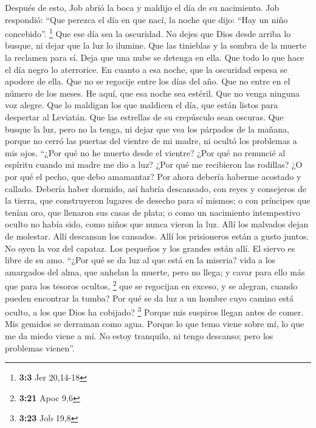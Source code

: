  Después de esto, Job abrió la boca y maldijo el día de su
nacimiento.  Job respondió:  ``Que perezca
el día en que nací, la noche que dijo: ``Hay un niño concebido''.
\footnote{\textbf{3:3} Jer 20,14-18}  Que ese día sea la
oscuridad. No dejes que Dios desde arriba lo busque, ni dejar que la luz
lo ilumine.  Que las tinieblas y la sombra de la muerte la
reclamen para sí. Deja que una nube se detenga en ella. Que todo lo que
hace el día negro lo aterrorice.  En cuanto a esa noche,
que la oscuridad espesa se apodere de ella. Que no se regocije entre los
días del año. Que no entre en el número de los meses.  He
aquí, que esa noche sea estéril. Que no venga ninguna voz alegre.
 Que lo maldigan los que maldicen el día, que están listos
para despertar al Leviatán.  Que las estrellas de su
crepúsculo sean oscuras. Que busque la luz, pero no la tenga, ni dejar
que vea los párpados de la mañana,  porque no cerró las
puertas del vientre de mi madre, ni ocultó los problemas a mis ojos.
 ``¿Por qué no he muerto desde el vientre? ¿Por qué no
renuncié al espíritu cuando mi madre me dio a luz?  ¿Por
qué me recibieron las rodillas? ¿O por qué el pecho, que debo amamantar?
 Por ahora debería haberme acostado y callado. Debería
haber dormido, así habría descansado,  con reyes y
consejeros de la tierra, que construyeron lugares de desecho para sí
mismos;  o con príncipes que tenían oro, que llenaron sus
casas de plata;  o como un nacimiento intempestivo oculto
no había sido, como niños que nunca vieron la luz.  Allí
los malvados dejan de molestar. Allí descansan los cansados.
 Allí los prisioneros están a gusto juntos. No oyen la
voz del capataz.  Los pequeños y los grandes están allí.
El siervo es libre de su amo.  ``¿Por qué se da luz al
que está en la miseria? vida a los amargados del alma, 
que anhelan la muerte, pero no llega; y cavar para ello más que para los
tesoros ocultos, \footnote{\textbf{3:21} Apoc 9,6}  que
se regocijan en exceso, y se alegran, cuando pueden encontrar la tumba?
 Por qué se da luz a un hombre cuyo camino está oculto, a
los que Dios ha cobijado? \footnote{\textbf{3:23} Job 19,8}
 Porque mis suspiros llegan antes de comer. Mis gemidos
se derraman como agua.  Porque lo que temo viene sobre
mí, lo que me da miedo viene a mí.  No estoy tranquilo,
ni tengo descanso; pero los problemas vienen''.

